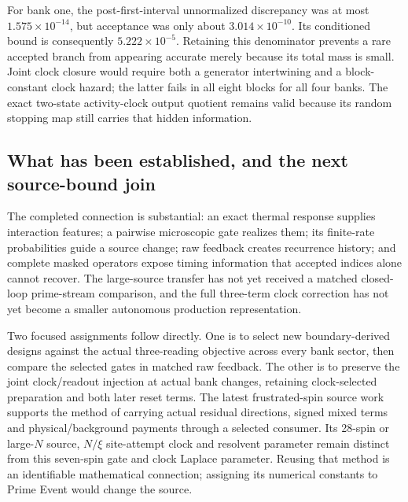 For bank one, the post-first-interval unnormalized discrepancy was at most $1.575\times10^{-14}$, but acceptance was only about $3.014\times10^{-10}$. Its conditioned bound is consequently $5.222\times10^{-5}$. Retaining this denominator prevents a rare accepted branch from appearing accurate merely because its total mass is small. Joint clock closure would require both a generator intertwining and a block-constant clock hazard; the latter fails in all eight blocks for all four banks. The exact two-state activity-clock output quotient remains valid because its random stopping map still carries that hidden information.

\subsection{What has been established, and the next source-bound join}

The completed connection is substantial: an exact thermal response supplies interaction features; a pairwise microscopic gate realizes them; its finite-rate probabilities guide a source change; raw feedback creates recurrence history; and complete masked operators expose timing information that accepted indices alone cannot recover. The large-source transfer has not yet received a matched closed-loop prime-stream comparison, and the full three-term clock correction has not yet become a smaller autonomous production representation.

Two focused assignments follow directly. One is to select new boundary-derived designs against the actual three-reading objective across every bank sector, then compare the selected gates in matched raw feedback. The other is to preserve the joint clock/readout injection at actual bank changes, retaining clock-selected preparation and both later reset terms. The latest frustrated-spin source work supports the method of carrying actual residual directions, signed mixed terms and physical/background payments through a selected consumer. Its 28-spin or large-$N$ source, $N/\xi$ site-attempt clock and resolvent parameter remain distinct from this seven-spin gate and clock Laplace parameter. Reusing that method is an identifiable mathematical connection; assigning its numerical constants to Prime Event would change the source.
